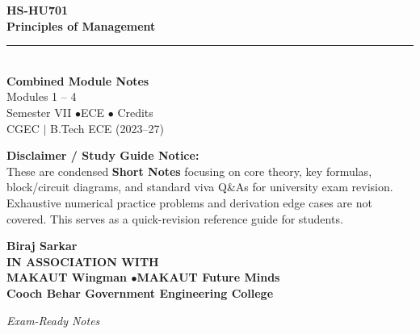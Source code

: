 \documentclass[12pt,a4paper]{article}
\begin{document}
\thispagestyle{empty}


\vspace*{1.0cm}
\begin{center}
  {\Huge\bfseries\color{myred} HS-HU701}\\[10pt]
  {\LARGE\bfseries\color{mydark} Principles of Management}\\[20pt]
  {\color{myred}\rule{0.7\linewidth}{1.5pt}}\\[18pt]
  {\Large\color{myteal}\textbf{Combined Module Notes}}\\[8pt]
  {\large\color{mydark} Modules 1 -- 4}\\[40pt]
  {\normalsize\color{mydark} Semester VII \quad$\bullet$\quad ECE \quad$\bullet$ Credits}\\[12pt]
  {\normalsize\color{mydark} CGEC \;$|$\; B.Tech ECE (2023--27)}
\end{center}
\vspace{1.0cm}
\begin{center}
  \begin{tcolorbox}[colback=mygray, colframe=mgframe, boxrule=0.5pt, arc=3pt, width=0.85\linewidth]
    \centering\small\color{mydark}
    \textbf{Disclaimer / Study Guide Notice:}\\
    These are condensed \textbf{Short Notes} focusing on core theory, key formulas, block/circuit diagrams, and standard viva Q\&As for university exam revision. Exhaustive numerical practice problems and derivation edge cases are not covered. This serves as a quick-revision reference guide for students.
  \end{tcolorbox}
\end{center}
\vfill
\vspace{0.6cm}
\begin{center}
  {\large\bfseries\color{mypurple} Biraj Sarkar}\\[16pt]
  {\footnotesize\color{watermark}\textbf{IN ASSOCIATION WITH}}\\[8pt]
  {\small\bfseries\color{mydark} MAKAUT Wingman \quad$\bullet$\quad MAKAUT Future Minds}\\[12pt]
  {\large\bfseries\color{myteal} Cooch Behar Government Engineering College}
\end{center}
\vfill
\begin{center}{\small\color{watermark}\textit{Exam-Ready Notes}}\end{center}
\clearpage
\end{document}
